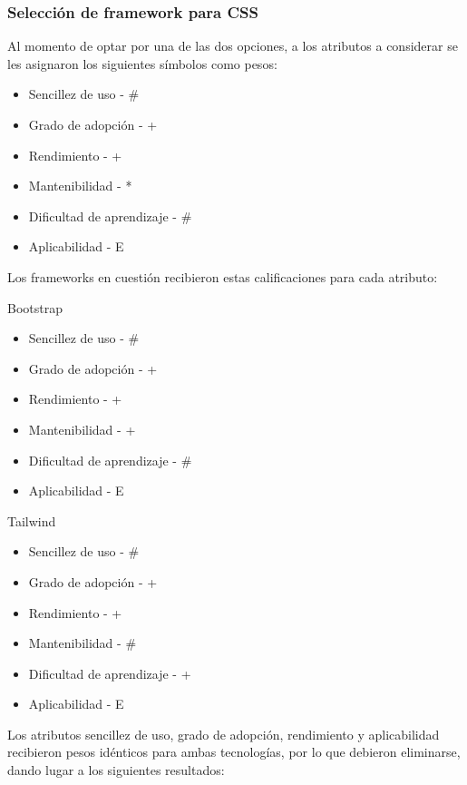 \documentclass{article}
\begin{document}
\subsubsection{Selección de framework para CSS}
Al momento de optar por una de las dos opciones, a los atributos a considerar se les asignaron los siguientes símbolos como pesos:
\begin{itemize}
    \item Sencillez de uso - \#
    \item Grado de adopción - +
    \item Rendimiento - +
    \item Mantenibilidad - *
    \item Dificultad de aprendizaje - \#
    \item Aplicabilidad - E
\end{itemize}
Los frameworks en cuestión recibieron estas calificaciones para cada atributo:

Bootstrap
\begin{itemize}
    \item Sencillez de uso - \#
    \item Grado de adopción - +
    \item Rendimiento - +
    \item Mantenibilidad - +
    \item Dificultad de aprendizaje - \#
    \item Aplicabilidad - E
\end{itemize}
Tailwind
\begin{itemize}
    \item Sencillez de uso - \#
    \item Grado de adopción - +
    \item Rendimiento - +
    \item Mantenibilidad - \#
    \item Dificultad de aprendizaje - +
    \item Aplicabilidad - E
\end{itemize}
Los atributos sencillez de uso, grado de adopción, rendimiento y aplicabilidad recibieron pesos idénticos para ambas tecnologías, por lo que debieron eliminarse, dando lugar a los siguientes resultados:
\end{document}
